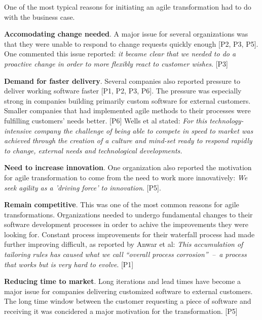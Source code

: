 One of the most typical reasons for initiating an agile transformation
had to do with the business case.

{\bfseries Accomodating change needed}. A major issue for
several organizations was that they were unable to respond to change
requests quickly enough [P2, P3, P5]. One commented this issue reported: \textit{it became clear
that we needed to do a proactive change in order to more flexibly react
to customer wishes}. [P3]

{\bfseries Demand for faster delivery}. Several companies also reported
pressure to deliver working software faster [P1, P2, P3, P6]. The
pressure was especially strong in companies building primarily custom
software for external customers. Smaller companies that had implemented
agile methods to their processes were fulfilling customers' needs
better. [P6] Wells et al stated: \textit{For this technology-intensive
company the challenge of being able to compete in speed to market was
achieved through the creation of a culture and mind-set ready to respond
rapidly to change, external needs and technological developments.}

{\bfseries Need to increase innovation}. One organization also reported
the motivation for agile transformation to come from the need to work
more innovatively: \textit{We seek agility as a 'driving force' to
innovation}. [P5].

{\bfseries Remain competitive}. This was one of the most common reasons for
agile transformations. Organizations needed to undergo fundamental changes to
their software development processes in order to achive the improvements they
were looking for. Constant process improvements for their waterfall process had
made further improving difficult, as reported by Anwar et al: \textit{This
accumulation of tailoring rules has caused what we call ``overall process
corrosion'' – a process that works but is very hard to evolve}. [P1]

{\bfseries Reducing time to market}. Long iterations and lead times have become
a major issue for companies delivering customized software to external
customers. The long time window between the customer requesting a piece of
software and receiving it was concidered a major motivation for the
transformation. [P5]
